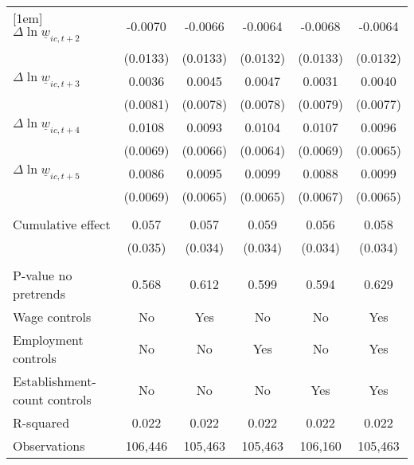 {\begin{tabular}{l*{5}{c}}
[1em]
$\Delta \ln \underline{w}_{ic,t+2}$&  -0.0070         &  -0.0066         &  -0.0064         &  -0.0068         &  -0.0064         \\
          & (0.0133)         & (0.0133)         & (0.0132)         & (0.0133)         & (0.0132)         \\
[1em]
$\Delta \ln \underline{w}_{ic,t+3}$&   0.0036         &   0.0045         &   0.0047         &   0.0031         &   0.0040         \\
          & (0.0081)         & (0.0078)         & (0.0078)         & (0.0079)         & (0.0077)         \\
[1em]
$\Delta \ln \underline{w}_{ic,t+4}$&   0.0108         &   0.0093         &   0.0104         &   0.0107         &   0.0096         \\
          & (0.0069)         & (0.0066)         & (0.0064)         & (0.0069)         & (0.0065)         \\
[1em]
$\Delta \ln \underline{w}_{ic,t+5}$&   0.0086         &   0.0095         &   0.0099         &   0.0088         &   0.0099         \\
          & (0.0069)         & (0.0065)         & (0.0065)         & (0.0067)         & (0.0065)         \\
\hline
\vspace{-2mm}&                  &                  &                  &                  &                  \\
Cumulative effect&    0.057         &0.057\sym{*}         &0.059\sym{*}         &    0.056         &0.058\sym{*}         \\
          &  (0.035)         &  (0.034)         &  (0.034)         &  (0.034)         &  (0.034)         \\
\hline    &                  &                  &                  &                  &                  \\
P-value no pretrends&    0.568         &    0.612         &    0.599         &    0.594         &    0.629         \\
Wage controls&       No         &      Yes         &       No         &       No         &      Yes         \\
Employment controls&       No         &       No         &      Yes         &       No         &      Yes         \\
Establishment-count controls&       No         &       No         &       No         &      Yes         &      Yes         \\
R-squared &    0.022         &    0.022         &    0.022         &    0.022         &    0.022         \\
Observations&  106,446         &  105,463         &  105,463         &  106,160         &  105,463         \\
\hline\hline
\end{tabular}
}
